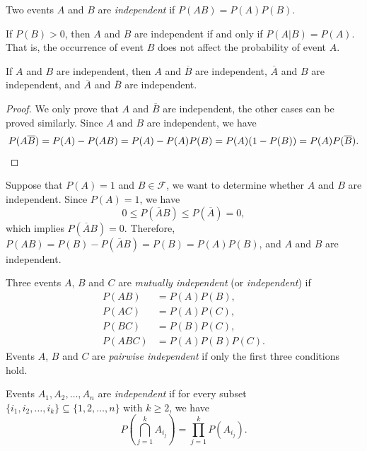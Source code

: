 \begin{definition}[Independence]
  Two events \(A\) and \(B\) are \emph{independent} if \(P(A B) = P(A) P(B)\).
\end{definition}

If \(P(B) > 0\), then \(A\) and \(B\) are independent if and only if \(P(A \vert B) = P(A)\). That is, the occurrence of event \(B\) does not affect the probability of event \(A\).

\begin{theorem}
  If \(A\) and \(B\) are independent, then \(A\) and \(\overline{B}\) are independent, \(\overline{A}\) and \(B\) are independent, and \(\overline{A}\) and \(\overline{B}\) are independent.
\end{theorem}

\begin{proof}
  We only prove that \(A\) and \(\overline{B}\) are independent, the other cases can be proved similarly. Since \(A\) and \(B\) are independent, we have
  \[
    P(A \overline{B}) = P(A) - P(A B) = P(A) - P(A) P(B) = P(A)(1 - P(B)) = P(A) P(\overline{B}). \qedhere
  \]
\end{proof}

\begin{example}
  Suppose that \(P(A) = 1\) and \(B \in \mathcal{F}\), we want to determine whether \(A\) and \(B\) are independent. Since \(P(A) = 1\), we have
  \[
    0 \leq P(\overline{A} B) \leq P(\overline{A}) = 0,
  \]
  which implies \(P(\overline{A} B) = 0\).
  Therefore, \(P(A B) = P(B) - P(\overline{A} B) = P(B) = P(A) P(B)\), and \(A\) and \(B\) are independent.
\end{example}

\begin{definition}
  Three events \(A\), \(B\) and \(C\) are \emph{mutually independent} (or \emph{independent}) if
  \begin{align*}
    P(A B) & = P(A) P(B), \\
    P(A C) & = P(A) P(C), \\
    P(B C) & = P(B) P(C), \\
    P(A B C) & = P(A) P(B) P(C).
  \end{align*}
  Events \(A\), \(B\) and \(C\) are \emph{pairwise independent} if only the first three conditions hold.
\end{definition}

\begin{definition}
  Events \(A_1, A_2, \dots, A_n\) are \emph{independent} if for every subset \(\{i_1, i_2, \dots, i_k\} \subseteq \{1, 2, \dots, n\}\) with \(k \geq 2\), we have
  \[
    P\left(\bigcap_{j=1}^k A_{i_j}\right) = \prod_{j=1}^k P(A_{i_j}).
  \]
\end{definition}

